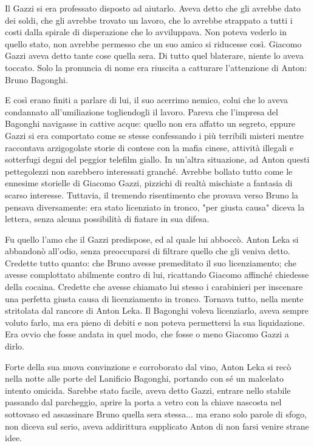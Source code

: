 Il Gazzi si era professato disposto ad aiutarlo. Aveva detto che gli avrebbe dato dei soldi, che gli avrebbe trovato un lavoro, che lo avrebbe strappato a tutti i costi dalla spirale di disperazione che lo avviluppava. Non poteva vederlo in quello stato, non avrebbe permesso che un suo amico si riducesse così. Giacomo Gazzi aveva detto tante cose quella sera. Di tutto quel blaterare, niente lo aveva toccato. Solo la pronuncia di nome era riuscita a catturare l'attenzione di Anton: Bruno Bagonghi.

E così erano finiti a parlare di lui, il suo acerrimo nemico, colui che lo aveva condannato all'umiliazione togliendogli il lavoro. Pareva che l'impresa del Bagonghi navigasse in cattive acque: quello non era affatto un segreto, eppure Gazzi si era comportato come se stesse confessando i più terribili misteri mentre raccontava arzigogolate storie di contese con la mafia cinese, attività illegali e sotterfugi degni del peggior telefilm giallo. In un'altra situazione, ad Anton questi pettegolezzi non sarebbero interessati granché. Avrebbe bollato tutto come le ennesime storielle di Giacomo Gazzi, pizzichi di realtà mischiate a fantasia di scarso interesse. Tuttavia, il tremendo risentimento che provava verso Bruno la pensava diversamente: era stato licenziato in tronco, "per giusta causa" diceva la lettera, senza alcuna possibilità di fiatare in sua difesa.

Fu quello l'amo che il Gazzi predispose, ed al quale lui abboccò. Anton Leka si abbandonò all'odio, senza preoccuparsi di filtrare quello che gli veniva detto. Credette tutto quanto: che Bruno avesse premeditato il suo licenziamento; che avesse complottato abilmente contro di lui, ricattando Giacomo affinché chiedesse della cocaina. Credette che avesse chiamato lui stesso i carabinieri per inscenare una perfetta giusta causa di licenziamento in tronco. Tornava tutto, nella mente stritolata dal rancore di Anton Leka. Il Bagonghi voleva licenziarlo, aveva sempre voluto farlo, ma era pieno di debiti e non poteva permettersi la sua liquidazione. Era ovvio che fosse andata in quel modo, che fosse o meno Giacomo Gazzi a dirlo.

Forte della sua nuova convinzione e corroborato dal vino, Anton Leka si recò nella notte alle porte del Lanificio Bagonghi, portando con sé un malcelato intento omicida. Sarebbe stato facile, aveva detto Gazzi, entrare nello stabile passando dal parcheggio, aprire la porta a vetro con la chiave nascosta nel sottovaso ed assassinare Bruno quella sera stessa... ma erano solo parole di sfogo, non diceva sul serio, aveva addirittura supplicato Anton di non farsi venire strane idee.

